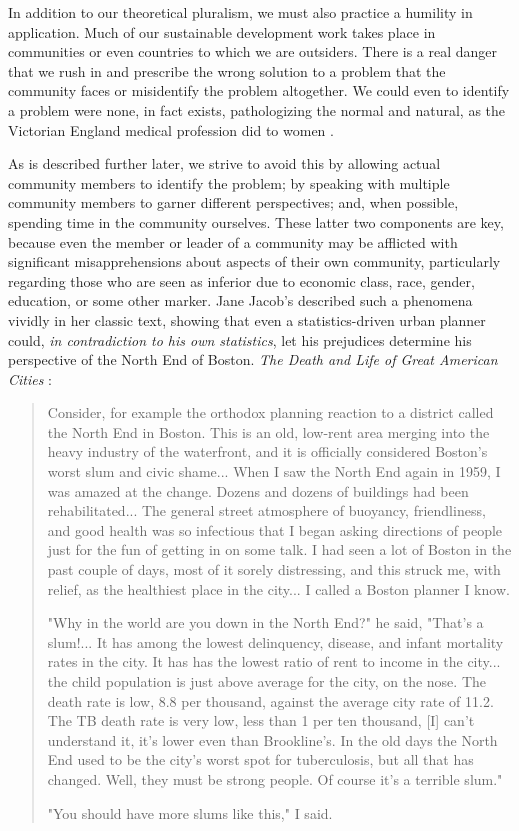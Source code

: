 In addition to our theoretical pluralism, we must also practice a humility in application. Much of our sustainable development work takes place in communities or even countries to which we are outsiders. There is a real danger that we rush in and prescribe the wrong solution to a problem that the community faces or misidentify the problem altogether. We could even to identify a problem were none, in fact exists, pathologizing the normal and natural, as the Victorian England medical profession did to women \cite{duffinConspicuousConsumptiveWoman2012}. 

As is described further later, we strive to avoid this by allowing actual community members to identify the problem; by speaking with multiple community members to garner different perspectives; and, when possible, spending time in the community ourselves. These latter two components are key, because even the member or leader of a community may be afflicted with significant misapprehensions about aspects of their own community, particularly regarding those who are seen as inferior due to economic class, race, gender, education, or some other marker. Jane Jacob's described such a phenomena vividly in her classic text, showing that even a statistics-driven urban planner could, \textit{in contradiction to his own statistics}, let his prejudices determine his perspective of the North End of Boston. \textit{The Death and Life of Great American Cities} \cite{jacobsDeathLifeGreat2016}:

\blockquote{Consider, for example the orthodox planning reaction to a district called the North End in Boston. This is an old, low-rent area merging into the heavy industry of the waterfront, and it is officially considered Boston's worst slum and civic shame... When I saw the North End again in 1959, I was amazed at the change. Dozens and dozens of buildings had been rehabilitated... The general street atmosphere of buoyancy, friendliness, and good health was so infectious that I began asking directions of people just for the fun of getting in on some talk. I had seen a lot of Boston in the past couple of days, most of it sorely distressing, and this struck me, with relief, as the healthiest place in the city... I called a Boston planner I know.

"Why in the world are you down in the North End?" he said, "That's a slum!... It has among the lowest delinquency, disease, and infant mortality rates in the city. It has has the lowest ratio of rent to income in the city... the child population is just above average for the city, on the nose. The death rate is low, 8.8 per thousand, against the average city rate of 11.2. The TB death rate is very low, less than 1 per ten thousand, [I] can't understand it, it's lower even than Brookline's. In the old days the North End used to be the city's worst spot for tuberculosis, but all that has changed. Well, they must be strong people. Of course it's a terrible slum."

"You should have more slums like this," I said.} 

